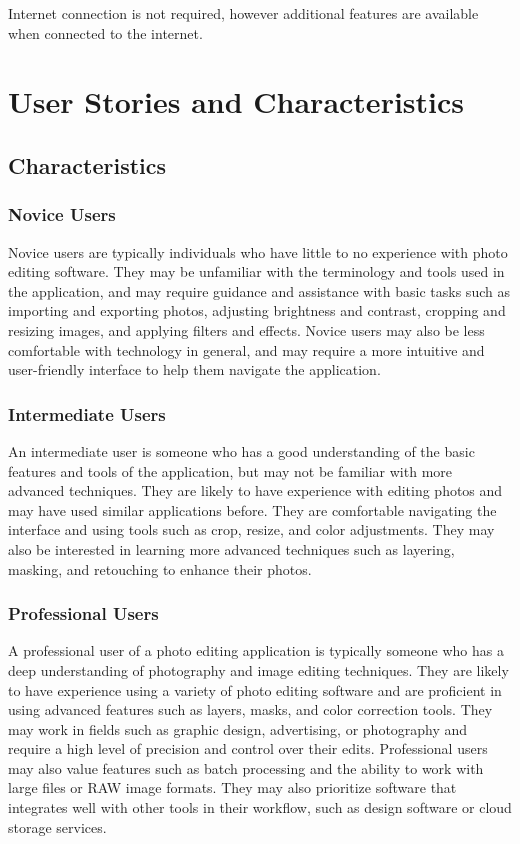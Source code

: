 \documentclass[11pt,a4paper]{article}
\begin{document}
 Internet connection is not required, however additional features are available when connected to the internet.

\section*{User Stories and Characteristics}

\subsection*{Characteristics}

\subsubsection*{Novice Users}

Novice users are typically individuals who have little to no experience with
photo editing software. They may be unfamiliar with the terminology and tools
used in the application, and may require guidance and assistance with basic
tasks such as importing and exporting photos, adjusting brightness and contrast,
cropping and resizing images, and applying filters and effects. Novice users may
also be less comfortable with technology in general, and may require a more
intuitive and user-friendly interface to help them navigate the application.


\subsubsection*{Intermediate Users}

An intermediate user is someone who has a good understanding of the basic
features and tools of the application, but may not be familiar with more
advanced techniques. They are likely to have experience with editing photos and
may have used similar applications before. They are comfortable navigating the
interface and using tools such as crop, resize, and color adjustments. They may
also be interested in learning more advanced techniques such as layering,
masking, and retouching to enhance their photos. 

\subsubsection*{Professional Users}

A professional user of a photo editing application is typically someone who has
a deep understanding of photography and image editing techniques. They are
likely to have experience using a variety of photo editing software and are
proficient in using advanced features such as layers, masks, and color
correction tools. They may work in fields such as graphic design, advertising,
or photography and require a high level of precision and control over their
edits. Professional users may also value features such as batch processing and
the ability to work with large files or RAW image formats. They may also
prioritize software that integrates well with other tools in their workflow,
such as design software or cloud storage services.
\end{document}
